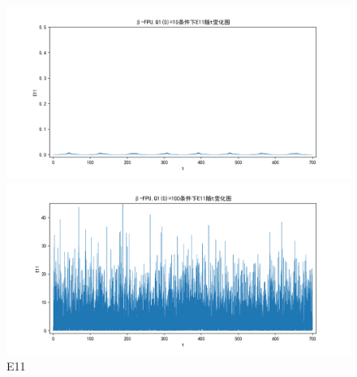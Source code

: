 \documentclass[10pt, a4paper]{article}
\begin{document}
    \begin{figure}[H]
        \begin{minipage}[t]{0.49\textwidth}
            \centering
            \includegraphics[width=\textwidth]{./q6_pics/cmp/E11.png}
        \end{minipage}
        \begin{minipage}[t]{0.49\textwidth}
            \centering
            \includegraphics[width=\textwidth]{./q6_pics/exp/E11.png}
        \end{minipage}
        \caption{E11}\label{fig:E11 in q6}
    \end{figure}
\end{document}

